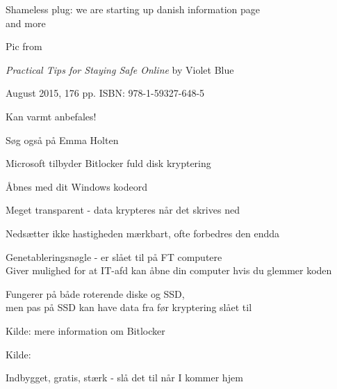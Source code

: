 \documentclass[20pt,landscape,a4paper]{foils}
\begin{document}
Shameless plug: we are starting up danish information page\\
and more 

Pic from 




\emph{Practical Tips for Staying Safe Online}
by Violet Blue

August 2015, 176 pp.
ISBN: 978-1-59327-648-5

Kan varmt anbefales!

Søg også på Emma Holten



\begin{list2}
\item Microsoft tilbyder Bitlocker fuld disk kryptering
\item Åbnes med dit Windows kodeord
\item Meget transparent - data krypteres når det skrives ned
\item Nedsætter ikke hastigheden mærkbart, ofte forbedres den endda
\item Genetableringsnøgle - er slået til på FT computere\\
Giver mulighed for at IT-afd kan åbne din computer hvis du glemmer koden
\item Fungerer på både roterende diske og SSD, \\
men pas på SSD kan have data fra før kryptering slået til
\end{list2}

Kilde: mere information om Bitlocker\\
{\footnotesize {}}



Kilde: {\small
{}}



\centerline{Indbygget, gratis, stærk - slå det til når I kommer hjem}
\end{document}

